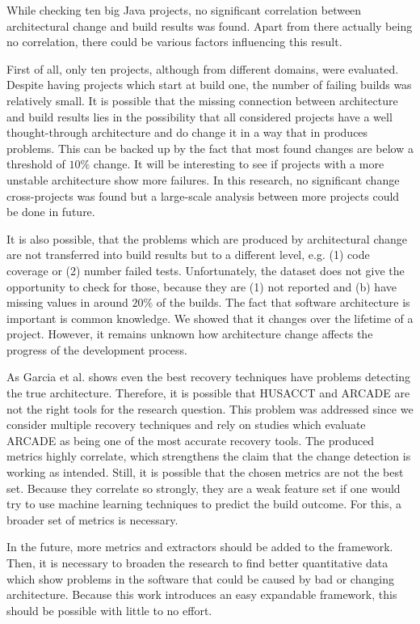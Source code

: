 \documentclass[conference]{IEEEtran}
\begin{document}
While checking ten big Java projects, no significant correlation between architectural change and build results was found. Apart from there actually being no correlation, there could be various factors influencing this result. 

First of all, only ten projects, although from different domains, were evaluated. Despite having projects which start at build one, the number of failing builds was relatively small. It is possible that the missing connection between architecture and build results lies in the possibility that all considered projects have a well thought-through architecture and do change it in a way that in produces problems. This can be backed up by the fact that most found changes are below a threshold of $10\%$ change. It will be interesting to see if projects with a more unstable architecture show more failures. In this research, no significant change cross-projects was found but a large-scale analysis between more projects could be done in future. 

It is also possible, that the problems which are produced by architectural change are not transferred into build results but to a different level, e.g. (1) code coverage or (2) number failed tests. Unfortunately, the dataset does not give the opportunity to check for those, because they are (1) not reported and (b) have missing values in around $20\%$ of the builds. The fact that software architecture is important is common knowledge. We showed that it changes over the lifetime of a project. However, it remains unknown how architecture change affects the progress of the development process.

As Garcia et al. \cite{arcRec-comparison} shows even the best recovery techniques have problems detecting the true architecture. Therefore, it is possible that HUSACCT and ARCADE are not the right tools for the research question. This problem was addressed since we consider multiple recovery techniques and rely on studies which evaluate ARCADE as being one of the most accurate recovery tools. The produced metrics highly correlate, which strengthens the claim that the change detection is working as intended. Still, it is possible that the chosen metrics are not the best set. Because they correlate so strongly, they are a weak feature set if one would try to use machine learning techniques to predict the build outcome. For this, a broader set of metrics is necessary. 

In the future, more metrics and extractors should be added to the framework. Then, it is necessary to broaden the research to find better quantitative data which show problems in the software that could be caused by bad or changing architecture. Because this work introduces an easy expandable framework, this should be possible with little to no effort.
\end{document}
